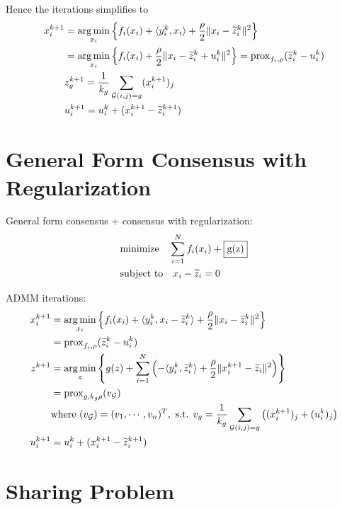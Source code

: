 Hence the iterations simplifies to
\begin{align*}
    x_i^{k+1} & = \operatorname*{arg\,min}_{x_i} \left\{ f_i(x_i) + \langle y_i^k,x_i \rangle + \dfrac{\rho}{2} \lVert x_i-\widetilde{z}_i^k \rVert^2 \right\} \\
    & = \operatorname*{arg\,min}_{x_i} \left\{ f_i(x_i) + \dfrac{\rho}{2} \lVert x_i - \widetilde{z}_i^k + u_i^k \rVert^2 \right\} = \operatorname{prox}_{f_i,\rho} (\widetilde{z}_i^k - u_i^k) \\
    & z_g^{k+1} = \dfrac{1}{k_g} \sum\limits_{\mathcal{G}(i,j)=g} (x_i^{k+1})_j \\
    & u_i^{k+1} = u_i^k + (x_i^{k+1} - \widetilde{z}^{k+1}_i)
\end{align*}

\section{General Form Consensus with Regularization}
General form consensus + consensus with regularization:
\begin{align*}
    & \text{minimize} \quad \sum\limits_{i=1}^N f_i(x_i) + \framebox{g(z)} \\
    & \text{subject to} \quad x_i - \widetilde{z}_i = 0
\end{align*}

ADMM iterations:
\begin{align*}
    x_i^{k+1} & = \operatorname*{arg\,min}_{x_i} \left\{ f_i(x_i) + \langle y_i^k, x_i-\widetilde{z}_i^k \rangle + \dfrac{\rho}{2}\lVert x_i-\widetilde{z}_i^k \rVert^2 \right\} \\
    & = \operatorname{prox}_{f_i,\rho} (\widetilde{z}_i^{k} - u_i^{k}) \\
    z^{k+1} & = \operatorname*{arg\,min}_z \left\{ g(z) + \sum\limits_{i=1}^N \left( -\langle y_i^k, \widetilde{z}_i^k \rangle + \dfrac{\rho}{2}\lVert x_i^{k+1}-\widetilde{z}_i \rVert^2 \right) \right\} \\
    & = \operatorname{prox}_{g,k_g\rho} (v_{\mathcal{G}}) \\
    & \text{where } (v_{\mathcal{G}}) = (v_1,\cdots,v_n)^T, \text{ s.t. } v_g = \dfrac{1}{k_g} \sum\limits_{\mathcal{G}(i,j)=g} \left( (x_i^{k+1})_j + (u_i^k)_j \right) \\
    u^{k+1}_i & = u_i^k + (x_i^{k+1} - \widetilde{z}^{k+1}_i)
\end{align*}

\section{Sharing Problem}

